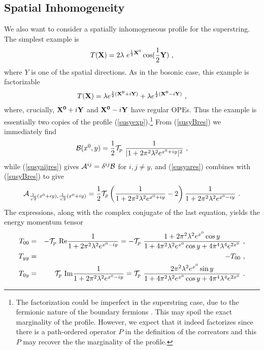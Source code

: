 \documentclass[a4paper,12pt]{article}
\begin{document}
\subsection{Spatial Inhomogeneity}
We also want to consider a spatially inhomogeneous profile for the 
superstring. The simplest example is 
\begin{equation}
T({\bf X}) = 2\lambda ~e^{{1\over 2}{\bf X}^0}\cos({1\over 2}{\bf Y})~,
\label{tachssp}
\end{equation}
where $Y$ is one of the spatial directions.  As in the bosonic case, this example is 
factorizable
\begin{equation}
T({\bf X}) = \lambda e^{{1\over 2}({\bf X^0}+i{\bf Y})} + \lambda e^{{1\over 2}({\bf X^0}-i{\bf Y})}~,
\end{equation}
where, crucially, ${\bf X^0}+i{\bf Y}$ and ${\bf X^0}-i{\bf Y}$ have regular OPEs.
Thus the example is essentially two copies 
of the profile (\ref{susyexp}).\footnote{The factorization could be imperfect in the
superstring case, due to the fermionic nature of the boundary fermions \cite{senspac}.
This may spoil the exact marginality of the profile.
However, we expect that it indeed factorizes since there is a path-ordered operator $P$ in the definition of the correators and this $P$ may recover the 
the marginality of the profile.}
{}From (\ref{susyBres})
we immediately find
\begin{equation}
{\cal B}(x^0,y) = {1\over 2}{\cal T}_p~{1\over |1+ 2\pi^2\lambda^2 e^{x^0+iy}|^2}~,
\end{equation}
while (\ref{susyaijres}) gives ${\cal A}^{ij} = \delta^{ij}{\cal B}$ for $i,j\neq y$, 
and (\ref{susyares}) combines with (\ref{susyBres}) to give
\begin{equation}
{\cal A}_{{1\over\sqrt{2}}(x^0+iy),{1\over\sqrt{2}}(x^0+iy)}
= {1\over 2}{\cal T}_p \left( {1\over 1+ 2\pi^2\lambda^2 e^{x^0+iy}} -2 \right)
{1\over 1+ 2\pi^2\lambda^2 e^{x^0-iy}}~.
\end{equation}
The expressions, along with the complex conjugate of the last equation, 
yields the energy momentum tensor
\begin{eqnarray}
T_{00}  &=& -{\cal T}_p ~{\rm Re} {1\over 1 + 2\pi^2\lambda^2 e^{x^0-iy}}
= - {\cal T}_p ~{1+2\pi^2 \lambda^2 e^{x^0}\cos y \over
1 + 4\pi^2 \lambda^2 e^{x^0}\cos y + 4\pi^4\lambda^4 e^{2x^0}}~,\\
T_{yy} &=& - T_{00}~,\\ 
T_{0y} &=& {\cal T}_p ~{\rm Im} {1\over 1 + 2\pi^2\lambda^2 e^{x^0-iy}}
=  {\cal T}_p ~{2\pi^2 \lambda^2 e^{x^0}\sin y \over
1 + 4\pi^2 \lambda^2 e^{x^0}\cos y + 4\pi^4\lambda^4 e^{2x^0}}~.
\end{eqnarray}
\end{document}
